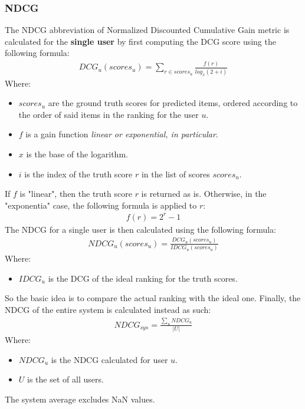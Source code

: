 \documentclass[11pt]{article}
\begin{document}
\subsubsection{NDCG}\label{subsubsec:ndcg}
The NDCG abbreviation of Normalized Discounted Cumulative Gain metric is calculated for the \textbf{single user}
by first computing the DCG score using the following formula:
\hfill\break
\hfill\break
    \[
       \begin{gathered}
           DCG_{u}(scores_{u}) = \sum_{r\in scores_{u}}{\frac{f(r)}{log_x(2 + i)}}
       \end{gathered}
    \]
\hfill\break
\hfill\break
    Where:
\begin{itemize}
    \item $scores_{u}$ are the ground truth scores for predicted items, ordered according to the order of said items in the
        ranking for the user $u$.
    \item $f$ is a gain function \textit{linear or exponential, in particular}.
    \item $x$ is the base of the logarithm.
    \item $i$ is the index of the truth score $r$ in the list of scores $scores_{u}$.
\end{itemize}
\hfill\break
\hfill\break
If $f$ is "linear", then the truth score $r$ is returned as is.
Otherwise, in the "exponentia" case, the following formula is applied to $r$:
\hfill\break
\hfill\break
    \[
       \begin{gathered}
           f(r) = 2^{r} - 1
       \end{gathered}
    \]
\hfill\break
\hfill\break
The NDCG for a single user is then calculated using the following formula:
\hfill\break
\hfill\break
    \[
       \begin{gathered}
           NDCG_u(scores_{u}) = \frac{DCG_{u}(scores_{u})}{IDCG_{u}(scores_{u})}
       \end{gathered}
    \]
\hfill\break
\hfill\break
    Where:
\begin{itemize}
    \item $IDCG_{u}$ is the DCG of the ideal ranking for the truth scores.
\end{itemize}
\hfill\break
\hfill\break
So the basic idea is to compare the actual ranking with the ideal one.
Finally, the NDCG of the entire system is calculated instead as such:
\hfill\break
\hfill\break
    \[
       \begin{gathered}
           NDCG_{sys} = \frac{\sum_{u} NDCG_u}{|U|}
       \end{gathered}
    \]
\hfill\break
\hfill\break
    Where:
\begin{itemize}
    \item $NDCG_u$ is the NDCG calculated for user $u$.
    \item $U$ is the set of all users.
\end{itemize}
\hfill\break
\hfill\break
The system average excludes NaN values.
\hfill\break
\hfill\break
\end{document}
